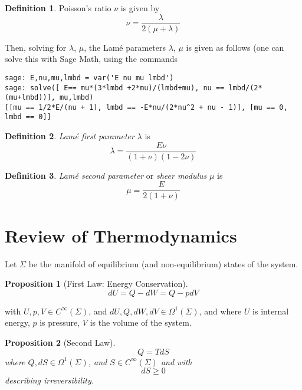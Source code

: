 \documentclass[twoside,landscape,10pt]{amsart}
\theoremstyle{plain}
\newtheorem{proposition}{Proposition}
\theoremstyle{definition}
\newtheorem{definition}{Definition}
\theoremstyle{remark}
\begin{document}
\begin{multicols*}{2}
\begin{definition}\label{Def:Poissonsratio}
  Poisson's ratio $\nu$ is given by 
\begin{equation}
  \nu = \frac{ \lambda }{ 2 (\mu + \lambda)}
\end{equation}
\end{definition}

Then, solving for $\lambda$, $\mu$, the Lam\'e parameters $\lambda$, $\mu$ is given as follows (one can solve this with Sage Math, using the commands
\begin{lstlisting}[frame=single]
sage: E,nu,mu,lmbd = var('E nu mu lmbd')
sage: solve([ E== mu*(3*lmbd +2*mu)/(lmbd+mu), nu == lmbd/(2*(mu+lmbd))], mu,lmbd)
[[mu == 1/2*E/(nu + 1), lmbd == -E*nu/(2*nu^2 + nu - 1)], [mu == 0, lmbd == 0]]
\end{lstlisting}

\begin{definition}\label{Def:Lame1stparameter}
  \emph{Lam\'e first parameter} $\lambda$ is 
\begin{equation}
  \lambda = \frac{E \nu }{ (1+\nu)(1-2 \nu ) }
\end{equation}
\end{definition}

\begin{definition}\label{Def:Lamesheermodulus}
  \emph{Lam\'e second parameter} or \emph{sheer modulus} $\mu$ is 
\begin{equation}
  \mu = \frac{E}{2(1+\nu)}
\end{equation}
\end{definition}



\section{Review of Thermodynamics}

Let $\Sigma$ be the manifold of equilibrium (and non-equilibrium) states of the system.  

\begin{proposition}[First Law: Energy Conservation]
\begin{equation}
dU = Q - dW = Q - pdV
\end{equation}
\end{proposition}
with $U, p ,V \in C^{\infty}(\Sigma)$, and $dU, Q, dW , dV \in \Omega^1(\Sigma)$, and where $U$ is internal energy, $p$ is pressure, $V$ is the volume of the system.  

\begin{proposition}[Second Law]
\begin{equation}
  Q = TdS
\end{equation} where $Q, dS \in \Omega^1(\Sigma)$, and $S \in C^{\infty}(\Sigma)$ and
with 
\begin{equation}
  dS \geq 0
\end{equation} describing irreversibility.  
\end{proposition}


\end{multicols*}
\end{document}
